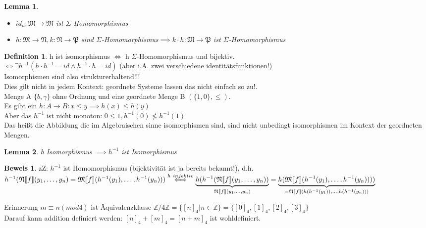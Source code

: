 \documentclass{article}
\newtheorem{lemma}{Lemma}[section]
\theoremstyle{definition}
\newtheorem{beweis}{Beweis}[section]
\newtheorem{definition}{Definition}[section]
\begin{document}
	\begin{lemma} 
	\begin{itemize}
		\item $id_n:\mathfrak{M}\to\mathfrak{M}$ ist $\Sigma$-Homomorphismus
		\item $h:\mathfrak{M}\to\mathfrak{N}, k:\mathfrak{N}\to\mathfrak{P}$ sind $\Sigma$-Homomorphismus$ \implies k\cdot h:\mathfrak{M}\to\mathfrak{P}$ ist $\Sigma$-Homomorphismus
	\end{itemize}
	\end{lemma}
	\begin{definition} h ist isomorphismus $\iff$ h $\Sigma$-Homomorphismus und bijektiv.\\
	$\iff \exists h^{-1}(h\cdot h^{-1}=id\land h^{-1}\cdot h=id)$ (aber i.A. zwei verschiedene identitätsfunktionen!)\\
	Isomorphismen sind also strukturerhaltend!!!\\
	Dies gilt nicht in jedem Kontext: geordnete Systeme lassen das nicht einfach so zu!.\\
	Menge A $\{b,\gamma\}$ ohne Ordnung und eine geordnete Menge B $(\{1,0\},\leq)$.\\
	Es gibt ein $h:A\to B: x\leq y\implies h(x)\leq h(y)$\\
	Aber das $h^{-1}$ ist nicht monoton: $0\leq 1, h^{-1}(0)\nleq h^{-1}(1)$\\
	Das heißt die Abbildung die im Algebraischen sinne isomorphismen sind, sind nicht unbedingt isomorphismen im Kontext der geordneten Mengen.
	\end{definition}
	\begin{lemma} h Isomorphismus $\implies h^{-1}$ ist Isomorphismus
	\end{lemma}
	\begin{beweis} zZ: $h^{-1}$ ist Homomorphismus (bijektivität ist ja bereits bekannt!), d.h.\\
	$h^{-1}(\mathfrak{N}\dbrack{f}(y_1,\dots,y_n)=\mathfrak{M}\dbrack{f}(h^{-1}(y_1),\dots,h^{-1}(y_n)))\stackrel{h\ injektiv}{\iff} \underbrace{h(h^{-1}(\mathfrak{N}\dbrack{f}(y_1,\dots,y_n)) }_{\mathfrak{N}\dbrack{f}(y_1,\dots,y_n)}= \underbrace{h(\mathfrak{M}\dbrack{f}(h^{-1}(y_1),\dots,h^{-1}(y_n))))}_{=\mathfrak{N}\dbrack{f}(h(h^{-1}(y_1)),\dots,h(h^{-1}(y_n)))}$
	\end{beweis}
	Erinnerung $m\equiv n (mod 4)$ ist Äquivalenzklasse $\mathbb{Z}/4\mathbb{Z} = \{[n]_4|n\in\mathbb{Z}\} = \{[0]_4,[1]_4,[2]_4,[3]_4\}$\\
	Darauf kann addition definiert werden: $[n]_4 +[m]_4 = [n+m]_4$ ist wohldefiniert.\\
\end{document}
